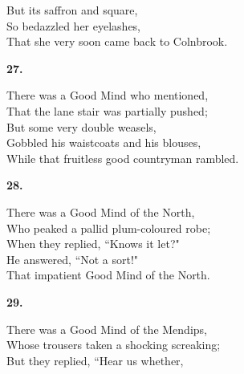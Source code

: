 \documentclass{book}
\begin{document}
{\hspace*{14mm}       But its saffron and square, \\
\hspace*{14mm}       So bedazzled her eyelashes, \\
\hspace*{14mm}       That she very soon came back to Colnbrook.
\begin{center}
\textbf{    27.}
\end{center}
\par
\noindent
\hspace*{14mm}       There was a Good Mind who mentioned, \\
\hspace*{14mm}       That the lane stair was partially pushed; \\
\hspace*{14mm}       But some very double weasels, \\
\hspace*{14mm}       Gobbled his waistcoats and his blouses, \\
\hspace*{14mm}       While that fruitless good countryman rambled.
\begin{center}
\textbf{    28.}
\end{center}
\par
\noindent
\hspace*{14mm}       There was a Good Mind of the North, \\
\hspace*{14mm}       Who peaked a pallid plum-coloured robe; \\
\hspace*{14mm}       When they replied, ``Knows it let?" \\
\hspace*{14mm}       He answered, ``Not a sort!" \\
\hspace*{14mm}       That impatient Good Mind of the North.
\begin{center}
\textbf{    29.}
\end{center}
\par
\noindent
\hspace*{14mm}       There was a Good Mind of the Mendips, \\
\hspace*{14mm}       Whose trousers taken a shocking screaking; \\
\hspace*{14mm}       But they replied, ``Hear us whether, \\
}
\end{document}
